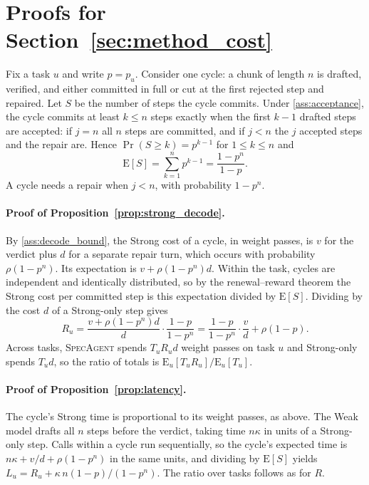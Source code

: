 \documentclass[11pt, copyright, logo, secondlogo]{template/lark}
\newcommand{\SpecAgent}{\textsc{SpecAgent}\xspace}
\begin{document}
\section{Proofs for Section~\ref{sec:method_cost}}
\label{sec:appendix_proofs}

Fix a task $u$ and write $p=p_u$. Consider one cycle: a chunk of length $n$
is drafted, verified, and either committed in full or cut at the first
rejected step and repaired. Let $S$ be the number of steps the cycle commits.
Under \cref{ass:acceptance}, the cycle commits at least $k\le n$ steps exactly
when the first $k-1$ drafted steps are accepted: if $j=n$ all $n$ steps are
committed, and if $j<n$ the $j$ accepted steps and the repair are. Hence
$\Pr(S\ge k)=p^{k-1}$ for $1\le k\le n$ and
\begin{equation}
\mathrm{E}[S]=\sum_{k=1}^{n}p^{k-1}=\frac{1-p^n}{1-p}.
\label{eq:expected_commit}
\end{equation}
A cycle needs a repair when $j<n$, with probability $1-p^n$.

\paragraph{Proof of Proposition~\ref{prop:strong_decode}.}
By \cref{ass:decode_bound}, the Strong cost of a cycle, in weight passes, is
$v$ for the verdict plus $d$ for a separate repair turn, which occurs with
probability $\rho(1-p^n)$. Its expectation is $v+\rho(1-p^n)d$. Within the
task, cycles are independent and identically distributed, so by the
renewal--reward theorem the Strong cost per committed step is this
expectation divided by $\mathrm{E}[S]$. Dividing by the cost $d$ of a
Strong-only step gives
\begin{equation*}
R_u=\frac{v+\rho(1-p^n)d}{d}\cdot\frac{1-p}{1-p^n}
=\frac{1-p}{1-p^n}\cdot\frac{v}{d}+\rho(1-p).
\end{equation*}
Across tasks, \SpecAgent{} spends $T_uR_ud$ weight passes on task $u$ and
Strong-only spends $T_ud$, so the ratio of totals is
$\mathrm{E}_u[T_uR_u]/\mathrm{E}_u[T_u]$.

\paragraph{Proof of Proposition~\ref{prop:latency}.}
The cycle's Strong time is proportional to its weight passes, as above. The
Weak model drafts all $n$ steps before the verdict, taking time $n\kappa$ in
units of a Strong-only step. Calls within a cycle run sequentially, so the
cycle's expected time is $n\kappa+v/d+\rho(1-p^n)$ in the same units, and
dividing by $\mathrm{E}[S]$ yields $L_u=R_u+\kappa\,n(1-p)/(1-p^n)$. The
ratio over tasks follows as for $R$.
\hfill\qedsymbol
\end{document}
